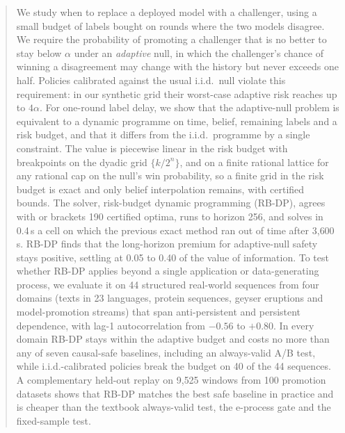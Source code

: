 \documentclass{article}
\theoremstyle{plain}
\theoremstyle{definition}
\theoremstyle{remark}
\begin{document}
\printAffiliationsAndNotice{}

\begin{abstract}
We study when to replace a deployed model with a challenger, using a small budget of labels bought on rounds where the two models disagree. We require the probability of promoting a challenger that is no better to stay below $\alpha$ under an \emph{adaptive} null, in which the challenger's chance of winning a disagreement may change with the history but never exceeds one half. Policies calibrated against the usual i.i.d.\ null violate this requirement: in our synthetic grid their worst-case adaptive risk reaches up to $4\alpha$. For one-round label delay, we show that the adaptive-null problem is equivalent to a dynamic programme on time, belief, remaining labels and a risk budget, and that it differs from the i.i.d.\ programme by a single constraint. The value is piecewise linear in the risk budget with breakpoints on the dyadic grid $\{k/2^n\}$, and on a finite rational lattice for any rational cap on the null's win probability, so a finite grid in the risk budget is exact and only belief interpolation remains, with certified bounds. The solver, risk-budget dynamic programming (RB-DP), agrees with or brackets 190 certified optima, runs to horizon 256, and solves in 0.4\,s a cell on which the previous exact method ran out of time after 3{,}600\,s. RB-DP finds that the long-horizon premium for adaptive-null safety stays positive, settling at 0.05 to 0.40 of the value of information. To test whether RB-DP applies beyond a single application or data-generating process, we evaluate it on 44 structured real-world sequences from four domains (texts in 23 languages, protein sequences, geyser eruptions and model-promotion streams) that span anti-persistent and persistent dependence, with lag-1 autocorrelation from $-0.56$ to $+0.80$. In every domain RB-DP stays within the adaptive budget and costs no more than any of seven causal-safe baselines, including an always-valid A/B test, while i.i.d.-calibrated policies break the budget on 40 of the 44 sequences. A complementary held-out replay on 9{,}525 windows from 100 promotion datasets shows that RB-DP matches the best safe baseline in practice and is cheaper than the textbook always-valid test, the e-process gate and the fixed-sample test.
\end{abstract}
\end{document}
